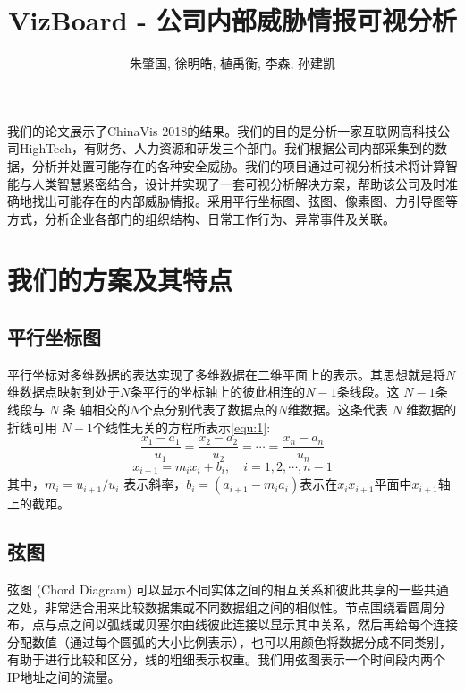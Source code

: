 \documentclass[journal]{vgtc}                %
\title{VizBoard - 公司内部威胁情报可视分析}
\author{朱肇国, 徐明皓, 植禹衡, 李森, 孙建凯}
\begin{document}


\maketitle

我们的论文展示了ChinaVis 2018的结果。我们的目的是分析一家互联网高科技公司HighTech，有财务、人力资源和研发三个部门。我们根据公司内部采集到的数据，分析并处置可能存在的各种安全威胁。我们的项目通过可视分析技术将计算智能与人类智慧紧密结合，设计并实现了一套可视分析解决方案，帮助该公司及时准确地找出可能存在的内部威胁情报。采用平行坐标图、弦图、像素图、力引导图等方式，分析企业各部门的组织结构、日常工作行为、异常事件及关联。

\section{我们的方案及其特点}
\subsection{平行坐标图}
平行坐标对多维数据的表达实现了多维数据在二维平面上的表示。其思想就是将$N$维数据点映射到处于$N$条平行的坐标轴上的彼此相连的$N-1$条线段。这 $N - 1$条线段与 $N$ 条 轴相交的$N$个点分别代表了数据点的$N$维数据。这条代表 $N$ 维数据的折线可用 $N -1$个线性无关的方程所表示\ref{equ:1}:
\begin{equation}
\label{equ:1}
\frac{x_1-a_1}{u_1}=\frac{x_2-a_2}{u_2}=\cdots = \frac{x_n-a_n}{u_n}
\end{equation}
\begin{equation}
\label{equ:2}
x_{i+1} = m_ix_i+b_i, \quad i = 1, 2, \cdots, n-1
\end{equation}
其中，$m_i = u_{i+1} / u_i$ 表示斜率，$b_i = (a_{i+1} - m_ia_i)$表示在$x_ix_{i+1}$平面中$x_{i+1}$轴上的截距。
\subsection{弦图}
弦图 (Chord Diagram) 可以显示不同实体之间的相互关系和彼此共享的一些共通之处，非常适合用来比较数据集或不同数据组之间的相似性。节点围绕着圆周分布，点与点之间以弧线或贝塞尔曲线彼此连接以显示其中关系，然后再给每个连接分配数值（通过每个圆弧的大小比例表示），也可以用颜色将数据分成不同类别，有助于进行比较和区分，线的粗细表示权重。我们用弦图表示一个时间段内两个IP地址之间的流量。
\end{document}
